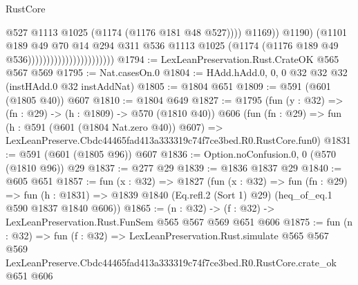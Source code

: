 \begin{lexlean}{RustCore}
\begin{coremodule}
                                                      @527
                                                      @1113
                                                      @1025
                                                      (@1174 (@1176 @181 @48 @527))))
                                                  @1169))
                                              @1190)
                                            (@1101
                                              @189
                                              @49
                                              @70
                                              @14
                                              @294
                                              @311
                                              @536
                                              @1113
                                              @1025
                                              (@1174 (@1176 @189 @49 @536)))))))))))))))))))))))
@1794 := LexLeanPreservation.Rust.CrateOK @565 @567 @569
@1795 := Nat.casesOn.{0}
@1804 := HAdd.hAdd.{0, 0, 0} @32 @32 @32 (instHAdd.{0} @32 instAddNat)
@1805 := @1804 @651
@1809 := @591 (@601 (@1805 @40)) @607
@1810 := @1804 @649
@1827 := @1795
    (fun (y : @32) => (fn : @29) -> (h : @1809) -> @570 (@1810 @40))
    @606
    (fun (fn : @29) =>
    fun (h : @591 (@601 (@1804 Nat.zero @40)) @607) =>
    LexLeanPreserve.Cbdc44465fad413a333319c74f7ce3bed.R0.RustCore.fun0)
@1831 := @591 (@601 (@1805 @96)) @607
@1836 := Option.noConfusion.{0, 0} (@570 (@1810 @96)) @29
@1837 := @277 @29
@1839 := @1836 @1837 @29
@1840 := @605 @651
@1857 := fun (x : @32) =>
  @1827
    (fun (x : @32) =>
    fun (fn : @29) =>
    fun (h : @1831) => @1839 @1840 (Eq.refl.{2} (Sort 1) @29) (heq_of_eq.{1} @590 @1837 @1840 @606))
@1865 := (n : @32) -> (f : @32) -> LexLeanPreservation.Rust.FunSem @565 @567 @569 @651 @606
@1875 := fun (n : @32) =>
  fun (f : @32) =>
  LexLeanPreservation.Rust.simulate
    @565
    @567
    @569
    LexLeanPreserve.Cbdc44465fad413a333319c74f7ce3bed.R0.RustCore.crate_ok
    @651
    @606
\end{coremodule}
\end{lexlean}
